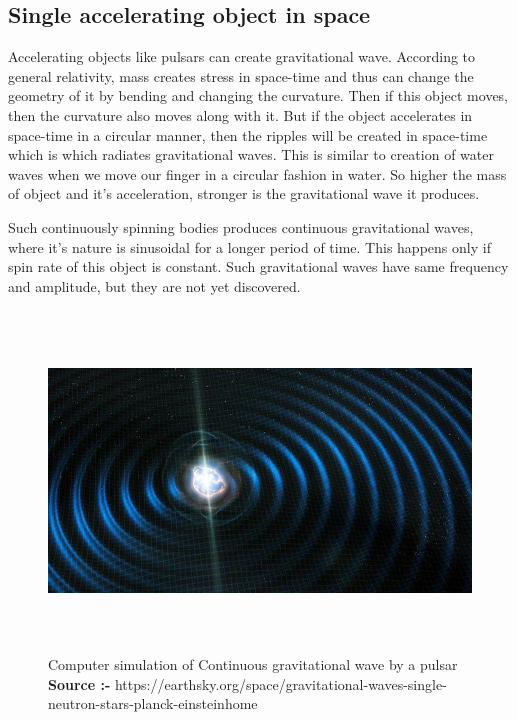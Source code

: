 \subsection{Single accelerating object in space}
 Accelerating objects like pulsars can create gravitational wave. According to general relativity, mass creates stress in space-time and thus can change the geometry of it by bending and changing the curvature. Then if this object moves, then the curvature also moves along with it. But if the object accelerates in space-time in a circular manner, then the ripples will be created in space-time which is which radiates gravitational waves. This is similar to creation of water waves when we move our finger in a circular fashion in water. So higher the mass of object and it's acceleration, stronger is the gravitational wave it produces.
 
 Such continuously spinning bodies produces continuous gravitational waves, where it's nature is sinusoidal for a longer period of time. This happens only if spin rate of this object is constant. Such gravitational waves have same frequency and amplitude, but they are not yet discovered.\\


\begin{figure}[h]
    \centering
     \includegraphics[height = 9cm, width = 12cm]{images.tex/continuous_gw.jpg}
    \caption{Computer simulation of Continuous gravitational wave by a pulsar \\
    \textbf{Source :-} https://earthsky.org/space/gravitational-waves-single-neutron-stars-planck-einsteinhome}
\end{figure}
